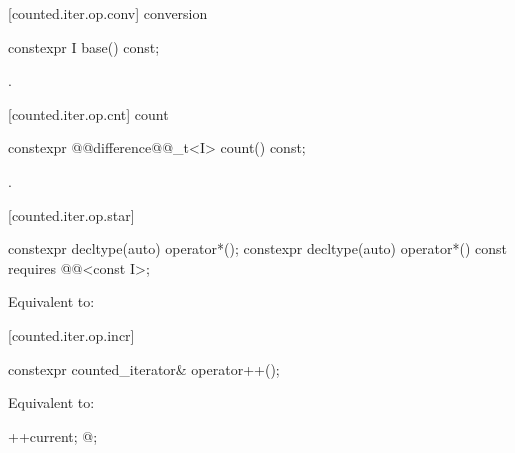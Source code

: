 \begin{addedblock}
[counted.iter.op.conv]{ conversion}

%
%
\begin{itemdecl}
constexpr I base() const;
\end{itemdecl}

\begin{itemdescr}
\pnum
\returns {}.
\end{itemdescr}

[counted.iter.op.cnt]{ count}

%
%
\begin{itemdecl}
constexpr @@difference@@_t<I> count() const;
\end{itemdecl}

\begin{itemdescr}
\pnum
\returns {}.
\end{itemdescr}

[counted.iter.op.star]{}

%
%
\begin{itemdecl}
constexpr decltype(auto) operator*();
constexpr decltype(auto) operator*() const
  requires @@<const I>;
\end{itemdecl}

\begin{itemdescr}
\pnum
\effects Equivalent to:
\end{itemdescr}

[counted.iter.op.incr]{}

%
%
\begin{itemdecl}
constexpr counted_iterator& operator++();
\end{itemdecl}

\begin{itemdescr}
\pnum
\requires {}

\pnum
\effects Equivalent to:
\begin{codeblock}
++current;
@\dcr@cnt;
\end{codeblock}


\end{itemdescr}
\end{addedblock}
